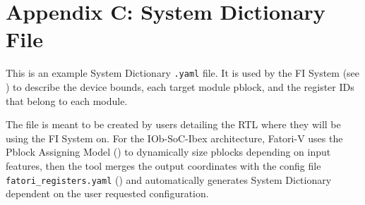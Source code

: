 \chapter{Appendix C: System Dictionary File}
\label{app_c:system_dict}

This is an example System Dictionary \texttt{.yaml} file. It is used by the \ac{FI} System (see ) to describe the device bounds, each target module pblock, and the register IDs that belong to each module.

The file is meant to be created by users detailing the \ac{RTL} where they will be using the \ac{FI} System on. For the IOb-SoC-Ibex \cite{iob-soc-ibex} architecture, \ac{Fatori-V} uses the Pblock Assigning Model () to dynamically size pblocks depending on input features, then the tool merges the output coordinates with the config file \texttt{fatori\_registers.yaml} () and automatically generates System Dictionary dependent on the user requested configuration.

